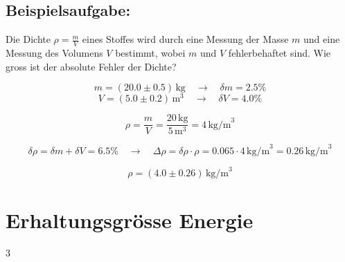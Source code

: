 \documentclass[a4paper, 8pt]{extarticle}
\begin{document}
\begin{landscape}
\begin{multicols*}{3}
\subsection{Beispielsaufgabe:} 
Die Dichte \( \rho = \frac{m}{V} \) eines Stoffes wird durch eine Messung der Masse \( m \) und eine Messung des Volumens \( V \) bestimmt, wobei \( m \) und \( V \) fehlerbehaftet sind. Wie gross ist der absolute Fehler der Dichte?

\[
m = (20.0 \pm 0.5) \, \text{kg} \quad \rightarrow \quad \delta m = 2.5\%
\]
\[
V = (5.0 \pm 0.2) \, \text{m}^3 \quad \rightarrow \quad \delta V = 4.0\%
\]

\[
\rho = \frac{m}{V} = \frac{20 \, \text{kg}}{5 \, \text{m}^3} = 4 \, \text{kg/m}^3
\]

\[
\delta \rho = \delta m + \delta V = 6.5\% \quad \rightarrow \quad \Delta \rho = \delta \rho \cdot \rho = 0.065 \cdot 4 \, \text{kg/m}^3 = 0.26 \, \text{kg/m}^3
\]

\[
\rho = (4.0 \pm 0.26) \, \text{kg/m}^3
\]

\section{Erhaltungsgrösse Energie}



		\end{multicols*}{3}

\end{landscape}
\end{document}
